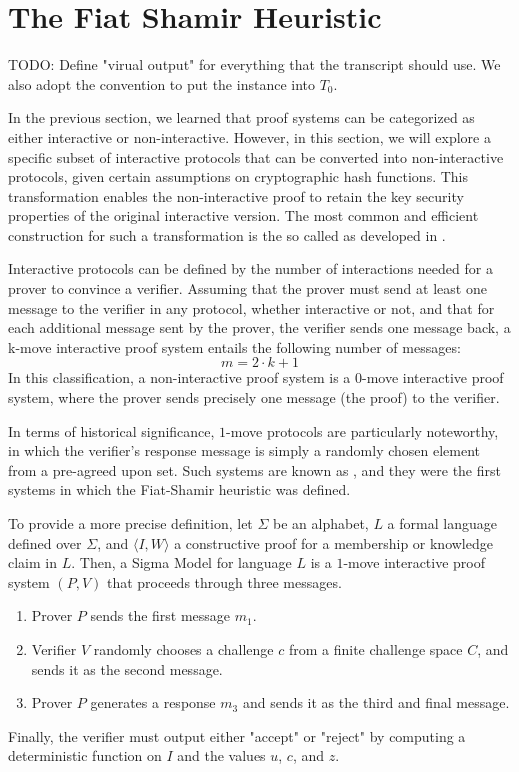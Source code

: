\section{The Fiat Shamir Heuristic}
TODO: Define "virual output" for everything that the transcript should use. We also adopt the convention to put the instance into $T_0$.



In the previous section, we learned that proof systems can be categorized as either interactive or non-interactive. However, in this section, we will explore a specific subset of interactive protocols that can be converted into non-interactive protocols, given certain assumptions on cryptographic hash functions. This transformation enables the non-interactive proof to retain the key security properties of the original interactive version. The most common and efficient construction for such a transformation is the so called  as developed in \cite{fiat-86}. 

Interactive protocols can be defined by the number of interactions needed for a prover to convince a verifier. Assuming that the prover must send at least one message to the verifier in any protocol, whether interactive or not, and that for each additional message sent by the prover, the verifier sends one message back, a k-move interactive proof system entails the following number of messages:
\begin{equation}
\label{def:k-move-interactive-protocol}
m = 2\cdot k +1
\end{equation}
In this classification, a non-interactive proof system is a 0-move interactive proof system, where the prover sends precisely one message (the proof) to the verifier. 

In terms of historical significance, $1$-move protocols are particularly noteworthy, in which the verifier's response message is simply a randomly chosen element from a pre-agreed upon set. Such systems are known as , and they were the first systems in which the Fiat-Shamir heuristic was defined.

To provide a more precise definition, let $\Sigma$ be an alphabet, $L$ a formal language defined over $\Sigma$, and $\langle I, W\rangle$ a constructive proof for a membership or knowledge claim in $L$. Then, a Sigma Model for language $L$ is a $1$-move interactive proof system $(P,V)$ that proceeds through three messages.
\begin{enumerate}
\label{def_sigma-model}
\item Prover $P$ sends the first message $m_1$.
\item Verifier $V$ randomly chooses a challenge $c$ from a finite challenge space $C$, and sends it as the second message.
\item Prover $P$ generates a response $m_3$ and sends it as the third and final message.
\end{enumerate}
Finally, the verifier must output either "accept" or "reject" by computing a deterministic function on $I$ and the values $u$, $c$, and $z$.

